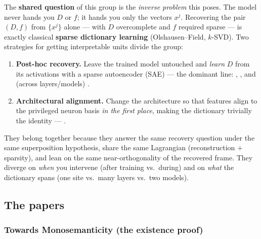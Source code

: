 The \textbf{shared question} of this group is the \emph{inverse problem} this poses. The model never hands you $D$ or $f$; it hands you only the vectors $x^{j}$. Recovering the pair $(D,f)$ from $\{x^{j}\}$ alone --- with $D$ overcomplete and $f$ required sparse --- is exactly classical \textbf{sparse dictionary learning} (Olshausen--Field, $k$-SVD). Two strategies for getting interpretable units divide the group:

\begin{enumerate}[leftmargin=2em]
\item \textbf{Post-hoc recovery.} Leave the trained model untouched and \emph{learn} $D$ from its activations with a sparse autoencoder (SAE) --- the dominant line: \textcite{towards-monosemanticity}, \textcite{scaling-monosemanticity}, and (across layers/models) \textcite{sparse-crosscoders-model-diffing}.
\item \textbf{Architectural alignment.} Change the architecture so that features align to the privileged neuron basis \emph{in the first place}, making the dictionary trivially the identity --- \textcite{softmax-linear-units}.
\end{enumerate}

They belong together because they answer the same recovery question under the same superposition hypothesis, share the same Lagrangian (reconstruction $+$ sparsity), and lean on the same near-orthogonality of the recovered frame. They diverge on \emph{when} you intervene (after training vs.\ during) and on \emph{what} the dictionary spans (one site vs.\ many layers vs.\ two models).

\subsection*{The papers}

\subsubsection*{Towards Monosemanticity (the existence proof)}

